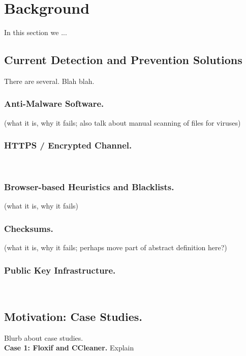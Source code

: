 \section{Background} \label{sec:background}

In this section we ...


\subsection{Current Detection and Prevention Solutions}

There are several. Blah blah.

\subsubsection{Anti-Malware Software.}    (what it is, why it fails; also talk
about manual scanning of files for viruses)

\subsubsection{HTTPS / Encrypted Channel.}   ~\cite{HTTP, HTTPS, TLS1, TLS2, DTLS}

\subsubsection{Browser-based Heuristics and Blacklists.}    (what it is, why it
fails)

\subsubsection{Checksums.}    (what it is, why it fails; perhaps move part of
abstract definition here?)

\subsubsection{Public Key Infrastructure.}   ~\cite{DANE1, DANE2, DANE3, OpenPGP1}

\subsection{Motivation: Case Studies.}

Blurb about case studies. \\

\noindent\textbf{Case 1: Floxif and CCleaner.} Explain \\

